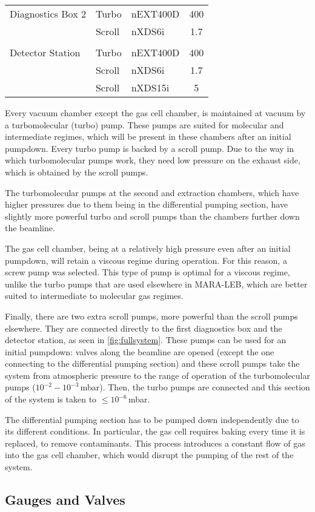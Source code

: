 \begin{table}[h!]
\begin{tabular}{@{}lllc@{}}
                                                            \\
    Diagnostics Box 2   & Turbo     & nEXT400D      & 400   \\
                        & Scroll    & nXDS6i        & 1.7   \\
                                                            \\
    Detector Station    & Turbo     & nEXT400D      & 400   \\
                        & Scroll    & nXDS6i        & 1.7   \\
                        & Scroll    & nXDS15i       & 5     \\
    \hline
    \end{tabular}
 \end{table}

Every vacuum chamber except the gas cell chamber, is maintained at vacuum by a turbomolecular (turbo) pump. These pumps are suited for molecular and intermediate regimes, which will be present in these chambers after an initial pumpdown. Every turbo pump is backed by a scroll pump. Due to the way in which turbomolecular pumps work, they need low pressure on the exhaust side, which is obtained by the scroll pumps.

The turbomolecular pumps at the second and extraction chambers, which have higher pressures due to them being in the differential pumping section, have slightly more powerful turbo and scroll pumps than the chambers further down the beamline.

The gas cell chamber, being at a relatively high pressure even after an initial pumpdown, will retain a viscous regime during operation. For this reason, a screw pump was selected. This type of pump is optimal for a viscous regime, unlike the turbo pumps that are used elsewhere in MARA-LEB, which are better suited to intermediate to molecular gas regimes.

Finally, there are two extra scroll pumps, more powerful than the scroll pumps elsewhere. They are connected directly to the first diagnostics box and the detector station, as seen in \autoref{fig:fullsystem}. These pumps can be used for an initial pumpdown: valves along the beamline are opened (except the one connecting to the differential pumping section) and these scroll pumps take the system from atmospheric pressure to the range of operation of the turbomolecular pumps ($10^{-2} - 10^{-3}\,$mbar). Then, the turbo pumps are connected and this section of the system is taken to $\leq10^{-6}\,$mbar. 

The differential pumping section has to be pumped down independently due to its different conditions. In particular, the gas cell requires baking every time it is replaced, to remove contaminants. This process introduces a constant flow of gas into the gas cell chamber, which would disrupt the pumping of the rest of the system. 


\subsection{Gauges and Valves}
\label{subsec:gaugesandvalves}




